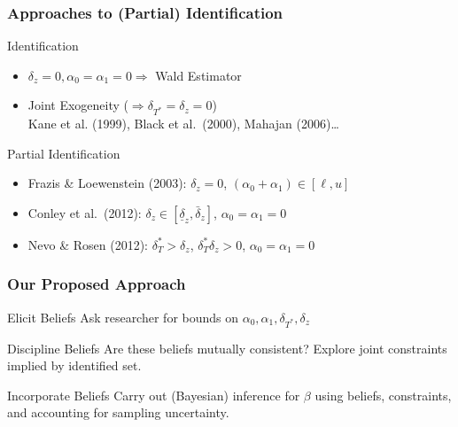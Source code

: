\documentclass{beamer}
\begin{document}
\begin{frame}
  \frametitle{Approaches to (Partial) Identification}
  \begin{block}{Identification}
    \begin{itemize}
      \item $\delta_z = 0, \alpha_0 = \alpha_1 = 0 \Rightarrow$ Wald Estimator
    \item Joint Exogeneity ($\Rightarrow \delta_{T^*} = \delta_z = 0$)\\
      \footnotesize Kane et al. (1999), Black et al.\ (2000), Mahajan (2006)\ldots
    \end{itemize}
    
  \end{block}

  \begin{block}{Partial Identification}
    \begin{itemize}
      \item Frazis \& Loewenstein (2003): $\delta_z = 0$, $(\alpha_0 + \alpha_1) \in [\ell, u]$ 
    \item Conley et al.\ (2012): $\delta_z \in [\underline{\delta}_z, \bar{\delta}_z]$, $\alpha_0 = \alpha_1 = 0$
    \item Nevo \& Rosen (2012): $\delta_T^* > \delta_z$, $\delta_T^* \delta_z > 0$, $\alpha_0 = \alpha_1 = 0$
    \end{itemize}
  \end{block}
    
\end{frame}
\begin{frame}
  \frametitle{Our Proposed Approach}
  \begin{block}{Elicit Beliefs}
    Ask researcher for bounds on $\alpha_0, \alpha_1, \delta_{T^*}, \delta_z$ 
  \end{block}

  \begin{block}{Discipline Beliefs}
    Are these beliefs mutually consistent? Explore joint constraints implied by identified set.
    
  \end{block}
  \begin{block}{Incorporate Beliefs}
    Carry out (Bayesian) inference for $\beta$ using beliefs, constraints, and accounting for sampling uncertainty.
  \end{block}
\end{frame}
\end{document}
